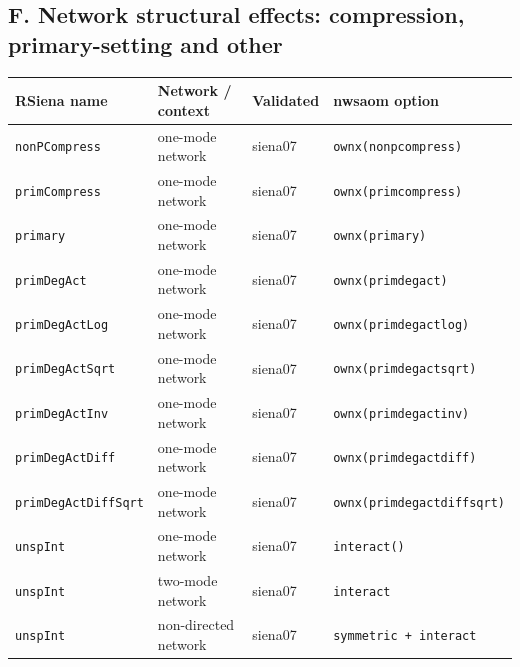 \subsection*{F. Network structural effects: compression, primary-setting and other}
\footnotesize
\begin{longtable}{@{}p{2.6cm}p{3.2cm}p{2.9cm}p{5.4cm}@{}}
\toprule
RSiena name & Network / context & Validated & nwsaom option\\
\midrule
\endhead
\texttt{nonPCompress} & one-mode network & siena07 & \texttt{ownx(nonpcompress)}\\
\texttt{primCompress} & one-mode network & siena07 & \texttt{ownx(primcompress)}\\
\texttt{primary} & one-mode network & siena07 & \texttt{ownx(primary)}\\
\texttt{primDegAct} & one-mode network & siena07 & \texttt{ownx(primdegact)}\\
\texttt{primDegActLog} & one-mode network & siena07 & \texttt{ownx(primdegactlog)}\\
\texttt{primDegActSqrt} & one-mode network & siena07 & \texttt{ownx(primdegactsqrt)}\\
\texttt{primDegActInv} & one-mode network & siena07 & \texttt{ownx(primdegactinv)}\\
\texttt{primDegActDiff} & one-mode network & siena07 & \texttt{ownx(primdegactdiff)}\\
\texttt{primDegActDiffSqrt} & one-mode network & siena07 & \texttt{ownx(primdegactdiffsqrt)}\\
\texttt{unspInt} & one-mode network & siena07 & \texttt{interact()}\\
\texttt{unspInt} & two-mode network & siena07 & \texttt{interact}\\
\texttt{unspInt} & non-directed network & siena07 & \texttt{symmetric + interact}\\
\bottomrule
\end{longtable}
\normalsize

